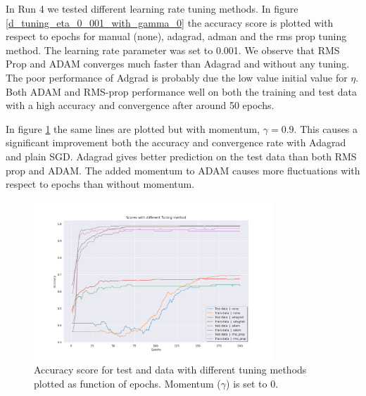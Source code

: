 
In Run 4 we tested different learning rate tuning methods. In figure
\ref{d_tuning_eta_0_001_with_gamma_0} the accuracy score is plotted
with respect to epochs for manual (none), adagrad, adman and the rms prop
tuning method. The learning rate parameter was set to 0.001. We observe that
RMS Prop and ADAM converges much faster than Adagrad and without any tuning.
The poor performance of Adgrad is probably due the low value initial value for
$\eta $. Both ADAM and RMS-prop performance well on both the training and test
data with a high accuracy and convergence after around 50 epochs. 

In figure \ref{fig:d_tuning_eta_0_001_with_gamma_0_9} the same lines are
plotted but with momentum, $\gamma = 0.9$. This causes a significant
improvement both the accuracy and convergence rate with Adagrad and plain SGD.   
Adagrad gives better prediction on the test data than both RMS prop and ADAM.
The added momentum to ADAM causes more fluctuations with respect to epochs than
without momentum.  

\begin{figure}[H]
    \centering
    \includegraphics[width=0.8\textwidth]{Figures/PartD/d_tuning_eta_0_001_with_gamma_0.png}
    \caption{Accuracy score for test and data with different tuning methods
    plotted as function of epochs. Momentum ($\gamma $) is set to 0.}  
    \label{fig:d_tuning_eta_0_001_with_gamma_0_9} 
\end{figure}


